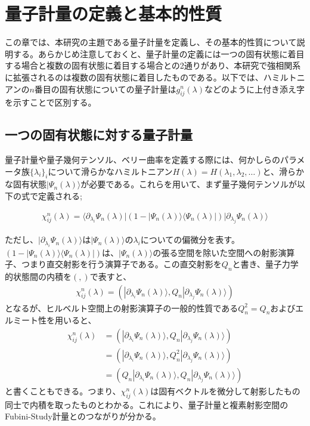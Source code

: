\documentclass[12pt]{jsbook}
\newcommand{\la}{\langle}
\newcommand{\ra}{\rangle}
\newcommand{\pa}{\partial}
\begin{document}
\chapter{量子計量の定義と基本的性質}
この章では、本研究の主題である量子計量を定義し、その基本的性質について説明する。あらかじめ注意しておくと、量子計量の定義には一つの固有状態に着目する場合と複数の固有状態に着目する場合との2通りがあり、本研究で強相関系に拡張されるのは複数の固有状態に着目したものである。以下では、ハミルトニアンの$n$番目の固有状態についての量子計量は$g_{ij}^{n}(\lambda)$などのように上付き添え字を示すことで区別する。

\section{一つの固有状態に対する量子計量}
量子計量や量子幾何テンソル、ベリー曲率を定義する際には、何かしらのパラメータ族$\{\lambda_i\}_i$について滑らかなハミルトニアン$H(\lambda)=H(\lambda_1,\lambda_2,\ldots)$と、滑らかな固有状態$|\Psi_n(\lambda)\ra$が必要である\cite{Resta2011}。これらを用いて、まず量子幾何テンソルが以下の式で定義される;

\begin{eqnarray}
\label{def_single_QGT}
\chi^{n}_{ij}(\lambda)=\la \pa_{\lambda_i} \Psi_n(\lambda)|(1-|\Psi_n(\lambda)\ra\la\Psi_n(\lambda)|)|\pa_{\lambda_j}\Psi_n(\lambda)\ra 
\end{eqnarray}

ただし、$|\pa_{\lambda_i}\Psi_n(\lambda)\ra $は$|\Psi_n(\lambda)\ra$の$\lambda_i$についての偏微分を表す。$(1-|\Psi_n(\lambda)\ra\la\Psi_n(\lambda)|)$は、$|\Psi_n(\lambda)\ra$の張る空間を除いた空間への射影演算子、つまり直交射影を行う演算子である。この直交射影を$Q_n$と書き、量子力学的状態間の内積を$(,)$で表すと、
\begin{eqnarray}
\chi^{n}_{ij}(\lambda)=(|\pa_{\lambda_i}\Psi_n(\lambda)\ra,Q_n|\pa_{\lambda_j}\Psi_n(\lambda)\ra)
\end{eqnarray}
となるが、ヒルベルト空間上の射影演算子の一般的性質である$Q_n^2=Q_n$およびエルミート性を用いると、
\begin{eqnarray}
\chi^{n}_{ij}(\lambda)&=(|\pa_{\lambda_i}\Psi_n(\lambda)\ra,Q_n|\pa_{\lambda_j}\Psi_n(\lambda)\ra)\\
&=(|\pa_{\lambda_i}\Psi_n(\lambda)\ra,Q_n^2|\pa_{\lambda_j}\Psi_n(\lambda)\ra)\\
&=(Q_n|\pa_{\lambda_i}\Psi_n(\lambda)\ra,Q_n|\pa_{\lambda_j}\Psi_n(\lambda)\ra)
\end{eqnarray}
と書くこともできる。つまり、$\chi^{n}_{ij}(\lambda)$は固有ベクトルを微分して射影したもの同士で内積を取ったものとわかる。これにより、量子計量と複素射影空間のFubini-Study計量\cite{nakahara2018geometry}とのつながりが分かる。
\end{document}
